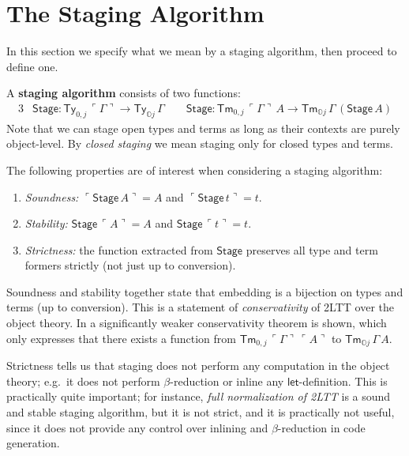 \documentclass[acmsmall,anonymous,review]{acmart}
\newcommand{\msf}[1]{\mathsf{#1}}
\newcommand{\mbb}[1]{\mathbb{#1}}
\newcommand{\mbbo}{\mbb{O}}
\newcommand{\Ty}{\msf{Ty}}
\newcommand{\Tm}{\msf{Tm}}
\newcommand{\emb}[1]{\ulcorner#1\urcorner}
\newcommand{\Stage}{\msf{Stage}}
\theoremstyle{remark}
\begin{document}
\section{The Staging Algorithm}\label{sec:staging-algorithm}

In this section we specify what we mean by a staging algorithm, then proceed to
define one.

\begin{definition}\label{def:staging}
A \textbf{staging algorithm} consists of two functions:
  \begin{alignat*}{3}
    & \Stage : \Ty_{0,j}\,\emb{\Gamma} \to \Ty_{\mbbo j}\,\Gamma\hspace{2em} \Stage : \Tm_{0,j}\,\emb{\Gamma}\,A \to \Tm_{\mbbo j}\,\Gamma\,(\Stage\,A)
  \end{alignat*}
Note that we can stage open types and terms as long as their contexts are purely
object-level. By \emph{closed staging} we mean staging only for closed types and
terms.
\end{definition}
\begin{definition}
  The following properties are of interest when considering a staging algorithm:
  \begin{enumerate}
  \item \emph{Soundness:} $\emb{\Stage\,A} = A$ and $\emb{\Stage\,t} = t$.
  \item \emph{Stability:} $\Stage\,\emb{A} = A$ and $\Stage\,\emb{t} = t$.
  \item \emph{Strictness:} the function extracted from $\Stage$ preserves all
    type and term formers strictly (not just up to conversion).
  \end{enumerate}
\end{definition}

Soundness and stability together state that embedding is a bijection
on types and terms (up to conversion). This is a statement of
\emph{conservativity} of 2LTT over the object theory. In \cite{twolevel} a
significantly weaker conservativity theorem is shown, which only expresses that
there exists a function from $\Tm_{0,j}\,\emb{\Gamma}\,\emb{A}$ to $\Tm_{\mbbo
  j}\,\Gamma\,A$.

Strictness tells us that staging does not perform any computation in the
object theory; e.g.\ it does not perform $\beta$-reduction or inline any
$\msf{let}$-definition. This is practically quite important; for instance,
\emph{full normalization of 2LTT} is a sound and stable staging algorithm, but
it is not strict, and it is practically not useful, since it does not
provide any control over inlining and $\beta$-reduction in code generation.
\end{document}
